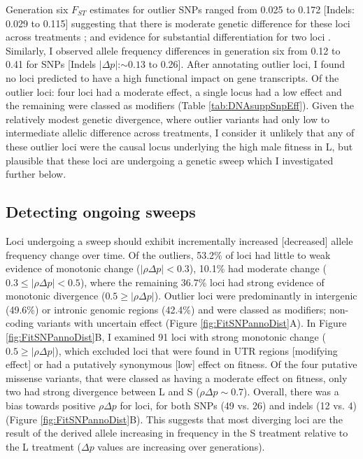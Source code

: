 Generation six $F_{ST}$ estimates for outlier SNPs ranged from 0.025 to 0.172 [Indels: 0.029 to 0.115] suggesting that there is moderate genetic difference for these loci across treatments \citep{Hart97}; and evidence for substantial differentiation for two loci \citep[$F_{ST} > 0.15$;][]{Fran02}. Similarly, I observed allele frequency differences in generation six from 0.12 to 0.41 for SNPs [Indels $|\Delta p|$:$\sim 0.13$ to 0.26]. After annotating outlier loci, I found no loci predicted to have a high functional impact on gene transcripts. Of the outlier loci: four loci had a moderate effect, a single locus had a low effect and the remaining were classed as modifiers (Table \ref{tab:DNAsuppSnpEff}). Given the relatively modest genetic divergence, where outlier variants had only low to intermediate allelic difference across treatments, I consider it unlikely that any of these outlier loci were the causal locus underlying the high male fitness in L, but plausible that these loci are undergoing a genetic sweep which I investigated further below.\par

\subsection{Detecting ongoing sweeps}
Loci undergoing a sweep should exhibit incrementally increased [decreased] allele frequency change over time. Of the outliers, 53.2\% of loci had little to weak evidence of monotonic change ($|\rho\Delta p| < 0.3$), 10.1\% had moderate change ($0.3 \leq |\rho\Delta p| < 0.5$), where the remaining 36.7\% loci had strong evidence of monotonic divergence ($0.5 \geq |\rho\Delta p|$). Outlier loci were predominantly in intergenic (49.6\%) or intronic genomic regions (42.4\%) and were classed as modifiers; non-coding variants with uncertain effect (Figure \ref{fig:FitSNPannoDist}A). In Figure \ref{fig:FitSNPannoDist}B, I examined 91 loci with strong monotonic change ($0.5 \geq |\rho\Delta p|$), which excluded loci that were found in UTR regions [modifying effect] or had a putatively synonymous [low] effect on fitness. Of the four putative missense variants, that were classed as having a moderate effect on fitness, only two had strong divergence between L and S ($\rho\Delta p \sim 0.7$). Overall, there was a bias towards positive $\rho\Delta p$ for loci, for both SNPs (49 vs. 26) and indels (12 vs. 4) (Figure \ref{fig:FitSNPannoDist}B). This suggests that most diverging loci are the result of the derived allele increasing in frequency in the S treatment relative to the L treatment ($\Delta p$ values are increasing over generations).\par  

